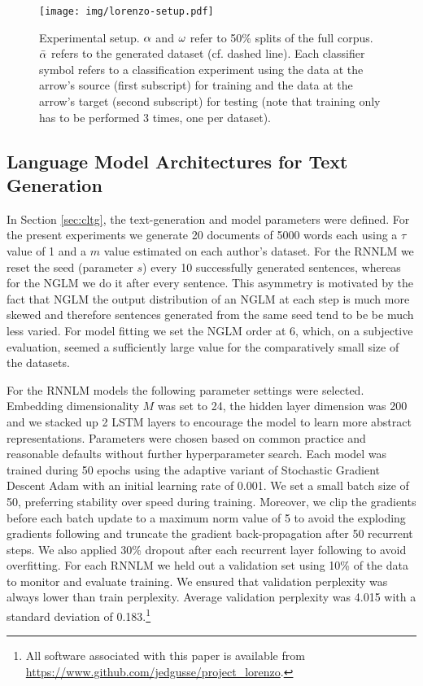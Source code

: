 \documentclass[11pt]{article}
\begin{document}
\begin{figure}[h]
	\centering
	\texttt{[image: img/lorenzo-setup.pdf]}
    \caption{
    Experimental setup. $\protect\alpha$ and $\protect\omega$ refer
    to 50\% splits of the full corpus. $\protect\bar{\alpha}$
    refers to the generated dataset (cf. dashed
    line). Each classifier symbol refers to a classification
    experiment using the data at the arrow's source (first subscript)
    for training and the data at the arrow's target (second
    subscript) for testing (note that training only has to be
    performed 3 times, one per dataset).
    }
    \label{fig:setup}
\end{figure}

\subsection{Language Model Architectures for Text Generation}
In Section \ref{sec:cltg}, the text-generation and model parameters were defined. 
For the present experiments we generate 20 documents of 5000 words each using
a $\tau$ value of 1 and a $m$ value estimated on each author's dataset. For the RNNLM we reset the seed (parameter $s$) every 10 successfully generated
sentences, whereas for the NGLM we do it after every sentence. This asymmetry is motivated by the fact that NGLM the output distribution of an NGLM at each step is much more skewed and therefore sentences generated from the same seed tend to be be much less varied. For model fitting we set the NGLM order at 6, which, on a subjective evaluation, seemed a sufficiently large value for the comparatively small size of the datasets. 

For the RNNLM models the following parameter settings were selected. Embedding dimensionality $M$ was set to 24, the hidden layer dimension was 200 and we stacked up 2 LSTM layers to encourage the model to learn more abstract representations. Parameters were chosen based on common practice and reasonable defaults without further hyperparameter search. Each model was trained during 50 epochs using the adaptive variant of Stochastic Gradient Descent
Adam \cite{Kingma2015} with an initial learning rate of 0.001. We set a small batch size of 50, preferring stability over speed during training. Moreover, we clip the gradients before each batch update to a maximum norm value of 5 to avoid the exploding gradients following \cite{Pacanu2013} and truncate the gradient back-propagation after 50 recurrent steps. We also applied 30\% dropout after each recurrent layer following \cite{Zaremba2015} to avoid overfitting. For each RNNLM we held out a validation set using 10\% of the data to monitor and evaluate training.
We ensured that validation perplexity was always lower than train perplexity.
Average validation perplexity was 4.015 with a standard deviation of 0.183.\footnote{
	All software associated with this paper is available from \url{https://www.github.com/jedgusse/project_lorenzo}.
}
\end{document}
